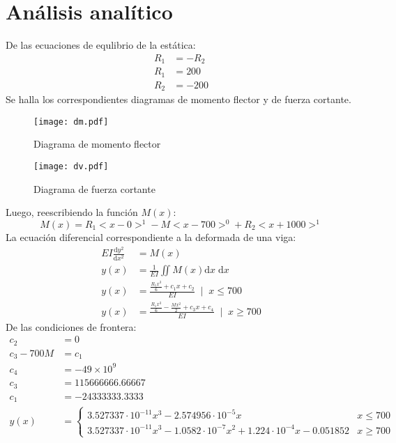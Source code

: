 \documentclass[12pt,a4paper]{article}
\newcommand{\mrm}{\mathrm}
\begin{document}
\section{Análisis analítico}
De las ecuaciones de equlibrio de la estática:
\begin{align*}
    R_{1} &= -R_{2}\\
    R_{1} &= 200\\
    R_{2} &= -200
\end{align*}
Se halla los correspondientes diagramas de momento flector y de fuerza cortante.
\begin{figure}[H]
    \centering
    \texttt{[image: dm.pdf]}
    \caption{Diagrama de momento flector}
\end{figure}
\begin{figure}[H]
    \centering
    \texttt{[image: dv.pdf]}
    \caption{Diagrama de fuerza cortante}
\end{figure}
Luego, reescribiendo la función $M(x)$:
\begin{equation}
M(x) = R_{1}<x-0>^{1} - M <x-700>^{0} + R_{2} <x+1000>^{1}
\end{equation}
La ecuación diferencial correspondiente a la deformada de una viga:
\begin{align}
    EI\frac{\mrm{d}y^{2}}{\mrm{d}x^{2}} &= M(x)\\
    y(x) &= \frac{1}{EI}\iint M(x) \mrm{d}x \;\mrm{d}x\\
    y(x) &= \frac{\frac{R_{1}x^{3}}{6} + c_{1}x + c_{2}}{EI} \;\;\vert \;\; x \leq 700\\
    y(x) &= \frac{\frac{R_{1}x^{3}}{6} - \frac{Mx^{2}}{2} + c_{3}x + c_{4}}{EI} \;\;\vert \;\;x \geq 700
\end{align}
De las condiciones de frontera:
\begin{align}
    c_{2} &= 0\\
    c_{3} - 700M &= c_{1}\\
    c_{4} &= -49\times 10^{9}\\
    c_{3} &= 115666666.66667\\
    c_{1} &= -24333333.3333 \\
    y(x) &= \begin{cases}
    3.527337\cdot 10^{-11} x^{3} - 2.574956 \cdot 10^{-5}x & x \leq 700\\
    3.527337\cdot 10^{-11} x^{3} - 1.0582 \cdot 10^{-7} x^{2} + 1.224 \cdot 10^{-4}x - 0.051852 & x \geq 700
    \end{cases}
\end{align}
\end{document}
